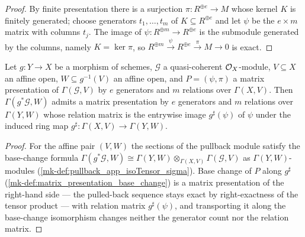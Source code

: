 \begin{proof}
  \leanok
  By finite presentation there is a surjection \(\pi : R^{\oplus e} \to M\)
  whose kernel \(K\) is finitely generated; choose generators
  \(t_1, \dots, t_m\) of \(K \subseteq R^{\oplus e}\) and let \(\psi\) be
  the \(e \times m\) matrix with columns \(t_j\).  The image of
  \(\psi : R^{\oplus m} \to R^{\oplus e}\) is the submodule generated by
  the columns, namely \(K = \ker \pi\), so
  \(R^{\oplus m} \xrightarrow{\psi} R^{\oplus e} \xrightarrow{\pi} M \to 0\)
  is exact.
\end{proof}

\begin{lemma}
  \label{mk-lem:presentation_pullback_sections}
  \leanok

  Let \(g : Y \to X\) be a morphism of schemes, \(\mathcal G\) a
  quasi-coherent \(\mathcal{O}_X\)-module, \(V \subseteq X\) an affine open,
  \(W \subseteq g^{-1}(V)\) an affine open, and \(P = (\psi, \pi)\) a matrix
  presentation of \(\Gamma(\mathcal G, V)\) by \(e\) generators and \(m\)
  relations over \(\Gamma(X, V)\).  Then \(\Gamma(g^*\mathcal G, W)\) admits
  a matrix presentation by \(e\) generators and \(m\) relations over
  \(\Gamma(Y, W)\) whose relation matrix is the entrywise image
  \(g^\sharp(\psi)\) of \(\psi\) under the induced ring map
  \(g^\sharp : \Gamma(X, V) \to \Gamma(Y, W)\).
\end{lemma}

\begin{proof}
  \leanok
  For the affine pair \((V, W)\) the sections of the pullback module satisfy
  the base-change formula
  \(\Gamma(g^*\mathcal G, W) \cong
    \Gamma(Y, W) \otimes_{\Gamma(X, V)} \Gamma(\mathcal G, V)\)
  as \(\Gamma(Y, W)\)-modules (\ref{mk-def:pullback_app_isoTensor_sigma}).
  Base change of \(P\) along \(g^\sharp\)
  (\ref{mk-def:matrix_presentation_base_change}) is a matrix presentation of
  the right-hand side --- the pulled-back sequence stays exact by
  right-exactness of the tensor product --- with relation matrix
  \(g^\sharp(\psi)\), and transporting it along the base-change isomorphism
  changes neither the generator count nor the relation matrix.
\end{proof}


